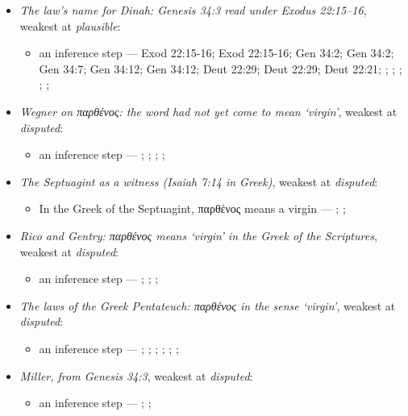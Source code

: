 \documentclass[11pt]{article}
\begin{document}
\begin{itemize}
\item \emph{The law’s name for Dinah: Genesis 34:3 read under Exodus 22:15–16}, weakest at \emph{plausible}:
\begin{itemize}
\item an inference step --- Exod 22:15-16; Exod 22:15-16; Gen 34:2; Gen 34:2; Gen 34:7; Gen 34:12; Gen 34:12; Deut 22:29; Deut 22:29; Deut 22:21; \cite[80, 91]{frymer-kensky-virginity-1998}; \cite[405--426]{enc-referential-analysis-1986}; \cite[18--21]{rico-gentry-infant-king-2020}; \cite[113]{bratcher-study-of-isaiah-1958}; \cite[483]{wegner-virgin-births-2011}; \cite[67]{rhodea-did-matthew-conceive-2013}
\end{itemize}
\item \emph{Wegner on παρθένος: the word had not yet come to mean ‘virgin’}, weakest at \emph{disputed}:
\begin{itemize}
\item an inference step --- \cite[482--483]{wegner-virgin-births-2011}; \cite[67]{rhodea-did-matthew-conceive-2013}; \cite{meade-ancient-versions-comment-2013}; \cite[18--21]{rico-gentry-infant-king-2020}; \cite[112--113]{bratcher-study-of-isaiah-1958}
\end{itemize}
\item \emph{The Septuagint as a witness (Isaiah 7:14 in Greek)}, weakest at \emph{disputed}:
\begin{itemize}
\item In the Greek of the Septuagint, παρθένος means a virgin --- \cite[21]{rico-gentry-infant-king-2020}; \cite[113]{bratcher-study-of-isaiah-1958}; \cite[472]{postell-isaiah-messianic-2025}
\end{itemize}
\item \emph{Rico and Gentry: παρθένος means ‘virgin’ in the Greek of the Scriptures}, weakest at \emph{disputed}:
\begin{itemize}
\item an inference step --- \cite[21]{rico-gentry-infant-king-2020}; \cite[472]{postell-isaiah-messianic-2025}; \cite[456]{davidson-immanuel-1899}; \cite{meade-ancient-versions-comment-2013}
\end{itemize}
\item \emph{The laws of the Greek Pentateuch: παρθένος in the sense ‘virgin’}, weakest at \emph{disputed}:
\begin{itemize}
\item an inference step --- \cite[113]{bratcher-study-of-isaiah-1958}; \cite[102]{bratcher-study-of-isaiah-1958}; \cite[1339]{liddell-scott-jones-lexicon-1940}; \cite[535]{muraoka-lexicon-septuagint-2009}; \cite[s.v. παρθένια]{lust-lexicon-septuagint-2003}; \cite{miller-born-divine-2003}; \cite[67]{rhodea-did-matthew-conceive-2013}
\end{itemize}
\item \emph{Miller, from Genesis 34:3}, weakest at \emph{disputed}:
\begin{itemize}
\item an inference step --- \cite{miller-born-divine-2003}; \cite[18--21]{rico-gentry-infant-king-2020}; \cite[113]{bratcher-study-of-isaiah-1958}
\end{itemize}
\end{itemize}
\end{document}
